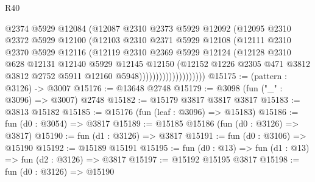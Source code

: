 \begin{lexlean}{R40}
\begin{coremodule}
                              @2374
                              @5929
                              @12084
                              (@12087
                                @2310
                                @2373
                                @5929
                                @12092
                                (@12095
                                  @2310
                                  @2372
                                  @5929
                                  @12100
                                  (@12103
                                    @2310
                                    @2371
                                    @5929
                                    @12108
                                    (@12111
                                      @2310
                                      @2370
                                      @5929
                                      @12116
                                      (@12119
                                        @2310
                                        @2369
                                        @5929
                                        @12124
                                        (@12128
                                          @2310
                                          @628
                                          @12131
                                          @12140
                                          @5929
                                          @12145
                                          @12150
                                          (@12152
                                            @1226
                                            @2305
                                            @471
                                            @3812
                                            @3812
                                            @2752
                                            @5911
                                            @12160
                                            @5948))))))))))))))))))))
@15175 := (pattern : @3126) -> @3007
@15176 := @13648 @2748
@15179 := @3098 (fun ("_" : @3096) => @3007) @2748
@15182 := @15179 @3817 @3817 @3817
@15183 := @3813 @15182
@15185 := @15176 (fun (leaf : @3096) => @15183)
@15186 := fun (d0 : @3054) => @3817
@15189 := @15185 @15186 (fun (d0 : @3126) => @3817)
@15190 := fun (d1 : @3126) => @3817
@15191 := fun (d0 : @3106) => @15190
@15192 := @15189 @15191
@15195 := fun (d0 : @13) => fun (d1 : @13) => fun (d2 : @3126) => @3817
@15197 := @15192 @15195 @3817
@15198 := fun (d0 : @3126) => @15190

\end{coremodule}
\end{lexlean}
